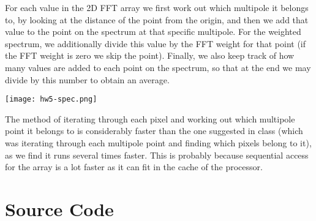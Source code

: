 \documentclass[12pt]{article}
\begin{document}
For each value in the 2D FFT array we first work out which multipole it belongs to, by looking at the distance of the point from the origin, and then we add that value to the point on the spectrum at that specific multipole.
For the weighted spectrum, we additionally divide this value by the FFT weight for that point (if the FFT weight is zero we skip the point).
Finally, we also keep track of how many values are added to each point on the spectrum, so that at the end we may divide by this number to obtain an average.

\begin{center}
\texttt{[image: hw5-spec.png]}
\end{center}

The method of iterating through each pixel and working out which multipole point it belongs to is considerably faster than the one suggested in class (which was iterating through each multipole point and finding which pixels belong to it), as we find it runs several times faster.
This is probably because sequential access for the array is a lot faster as it can fit in the cache of the processor.


\section{Source Code}

\end{document}
